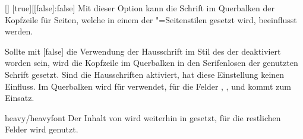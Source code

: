 \begin{Declaration}[v2.02]{[\PSet]}%
  [true][[false]:false]
\printdeclarationlist%
%
%
%
Mit dieser Option kann die Schrift im Querbalken der Kopfzeile für Seiten, 
welche in einem der "=Seitenstilen gesetzt wird, 
beeinflusst werden.
%
\begin{values}
\itemfalse
  Sollte mit [false] die Verwendung der Hausschrift im Stil des 
  \CDs der \TnUD deaktiviert worden sein, wird die Kopfzeile im Querbalken in
  den Serifenlosen der genutzten Schrift gesetzt. Sind die Hausschriften 
  aktiviert, hat diese Einstellung keinen Einfluss.
  Im Querbalken wird für   verwendet, 
  für die Felder , ,  und 
   kommt  zum Einsatz.
\item[heavy/heavyfont]
  Der Inhalt von  wird weiterhin in  
  gesetzt, für die restlichen Felder wird  genutzt.
\end{values}
\end{Declaration}

